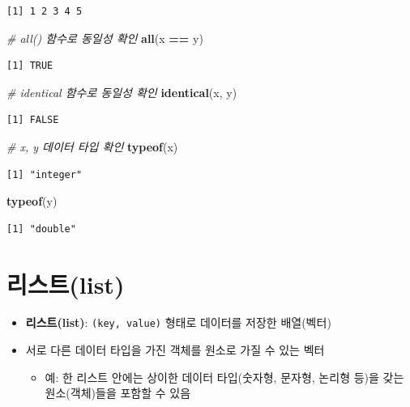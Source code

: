 \documentclass[
  11pt,
]{krantz}
\newenvironment{Shaded}{\begin{snugshade}}{\end{snugshade}}
\newcommand{\CommentTok}[1]{\textcolor[rgb]{0.37,0.37,0.37}{\textit{#1}}}
\newcommand{\KeywordTok}[1]{\textcolor[rgb]{0.27,0.27,0.27}{\textbf{#1}}}
\newcommand{\NormalTok}[1]{#1}
\newcommand{\OperatorTok}[1]{\textcolor[rgb]{0.43,0.43,0.43}{\textbf{#1}}}
\newcommand{\StringTok}[1]{\textcolor[rgb]{0.5,0.5,0.5}{#1}}
\providecommand{\tightlist}{%
  \setlength{\itemsep}{0pt}\setlength{\parskip}{0pt}}
\begin{document}
\begin{verbatim}
[1] 1 2 3 4 5
\end{verbatim}

\begin{Shaded}
\begin{Highlighting}[]
\CommentTok{# all() 함수로 동일성 확인}
\KeywordTok{all}\NormalTok{(x }\OperatorTok{==}\StringTok{ }\NormalTok{y)}
\end{Highlighting}
\end{Shaded}

\begin{verbatim}
[1] TRUE
\end{verbatim}

\begin{Shaded}
\begin{Highlighting}[]
\CommentTok{# identical 함수로 동일성 확인}
\KeywordTok{identical}\NormalTok{(x, y)}
\end{Highlighting}
\end{Shaded}

\begin{verbatim}
[1] FALSE
\end{verbatim}

\begin{Shaded}
\begin{Highlighting}[]
\CommentTok{# x, y 데이터 타입 확인}
\KeywordTok{typeof}\NormalTok{(x)}
\end{Highlighting}
\end{Shaded}

\begin{verbatim}
[1] "integer"
\end{verbatim}

\begin{Shaded}
\begin{Highlighting}[]
\KeywordTok{typeof}\NormalTok{(y)}
\end{Highlighting}
\end{Shaded}

\begin{verbatim}
[1] "double"
\end{verbatim}

\normalsize

\hypertarget{list}{%
\section{리스트(list)}\label{list}}

\begin{itemize}
\tightlist
\item
  \textbf{리스트(list)}: \texttt{(key,\ value)} 형태로 데이터를 저장한 배열(벡터)
\item
  서로 다른 데이터 타입을 가진 객체를 원소로 가질 수 있는 벡터

  \begin{itemize}
  \tightlist
  \item
    예: 한 리스트 안에는 상이한 데이터 타입(숫자형, 문자형, 논리형 등)을 갖는 원소(객체)들을 포함할 수 있음
  \end{itemize}
\end{itemize}
\end{document}
